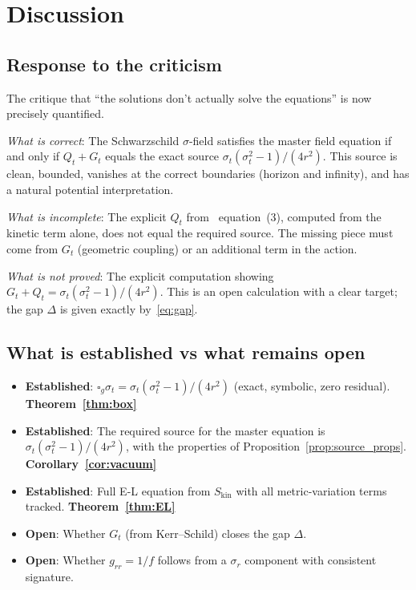 \documentclass[11pt,a4paper]{article}
\theoremstyle{plain}
\theoremstyle{definition}
\newcommand{\sig}{\sigma}
\newcommand{\sigt}{\sigma_t}
\newcommand{\boxg}{\square_g}
\newcommand{\Skin}{S_{\mathrm{kin}}}
\begin{document}
\section{Discussion}

\subsection{Response to the criticism}

The critique that ``the solutions don't actually solve the equations''
is now precisely quantified.

\emph{What is correct}: The Schwarzschild $\sig$-field satisfies
the master field equation if and only if $Q_t + G_t$ equals the
exact source $\sigt(\sigt^2-1)/(4r^2)$.  This source is clean,
bounded, vanishes at the correct boundaries (horizon and infinity),
and has a natural potential interpretation.

\emph{What is incomplete}: The explicit $Q_t$ from~\cite{matshaba2026:ch3}
equation~(3), computed from the kinetic term alone, does not equal
the required source.  The missing piece must come from $G_t$
(geometric coupling) or an additional term in the action.

\emph{What is not proved}: The explicit computation showing
$G_t + Q_t = \sigt(\sigt^2-1)/(4r^2)$.  This is an open
calculation with a clear target; the gap $\Delta$ is given
exactly by~\eqref{eq:gap}.

\subsection{What is established vs what remains open}

\begin{itemize}
  \item \textbf{Established}: $\boxg\sigt = \sigt(\sigt^2-1)/(4r^2)$
    (exact, symbolic, zero residual). \hfill \textbf{Theorem~\ref{thm:box}}
  \item \textbf{Established}: The required source for the master
    equation is $\sigt(\sigt^2-1)/(4r^2)$, with the properties
    of Proposition~\ref{prop:source_props}. \hfill \textbf{Corollary~\ref{cor:vacuum}}
  \item \textbf{Established}: Full E-L equation from $\Skin$
    with all metric-variation terms tracked. \hfill \textbf{Theorem~\ref{thm:EL}}
  \item \textbf{Open}: Whether $G_t$ (from Kerr--Schild) closes
    the gap $\Delta$.
  \item \textbf{Open}: Whether $g_{rr} = 1/f$ follows from
    a $\sig_r$ component with consistent signature.
\end{itemize}
\end{document}
